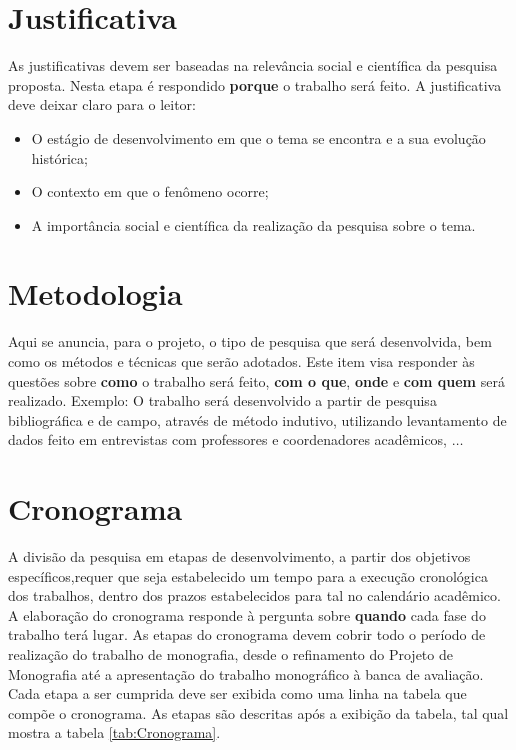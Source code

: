 \section{Justificativa}

As justificativas devem ser baseadas na relevância social e científica da pesquisa proposta. Nesta etapa é respondido \textbf{porque} o trabalho será feito. A justificativa deve deixar claro para o leitor:

\begin{itemize}
 \item O estágio de desenvolvimento em que o tema se encontra e a sua evolução histórica;
\item O contexto em que o fenômeno ocorre;
\item A importância social e científica da realização da pesquisa sobre o tema.
\end{itemize}


\section{Metodologia}

Aqui se anuncia, para o projeto, o tipo de pesquisa que será desenvolvida, bem como os métodos e técnicas que serão adotados. Este item visa responder às questões sobre \textbf{como} o trabalho será feito,\textbf{ com o que},
\textbf{onde} e \textbf{com quem} será realizado.
Exemplo: O trabalho será desenvolvido a partir de pesquisa bibliográfica e de campo, através de método indutivo, utilizando levantamento de dados feito em entrevistas com professores e coordenadores acadêmicos, $\ldots$



\section{Cronograma}

A divisão da pesquisa em etapas de desenvolvimento, a partir dos objetivos específicos,requer que seja estabelecido um tempo para a execução cronológica dos trabalhos, dentro dos prazos estabelecidos para tal no calendário acadêmico. A elaboração do
cronograma responde à pergunta sobre \textbf{quando} cada fase do trabalho terá lugar. As etapas do cronograma devem cobrir todo o período de realização do trabalho de monografia, desde o refinamento do Projeto de Monografia até a apresentação do
trabalho monográfico à banca de avaliação. Cada etapa a ser cumprida deve ser exibida como uma linha na tabela que compõe o cronograma. As etapas são descritas após a exibição da tabela, tal qual mostra a tabela \ref{tab:Cronograma}.

